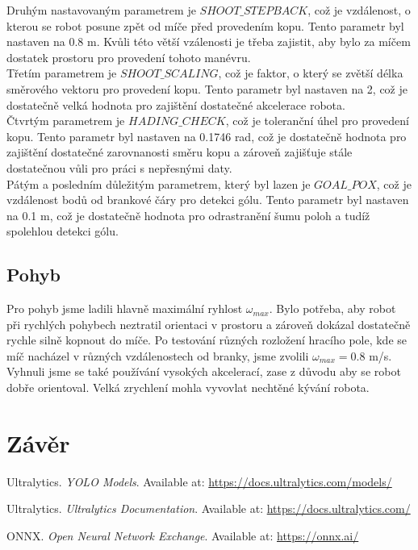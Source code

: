 \documentclass[a4paper,12pt]{article}
\begin{document}
Druhým nastavovaným parametrem je $SHOOT\_STEPBACK$, což je vzdálenost, o kterou se robot posune zpět od míče před provedením kopu. Tento parametr byl nastaven na 0.8 m. Kvůli této větší vzálenosti je třeba zajistit, aby bylo za míčem dostatek prostoru pro provedení tohoto manévru.\\
Třetím parametrem je $SHOOT\_SCALING$, což je faktor, o který se zvětší délka směrového vektoru pro provedení kopu. Tento parametr byl nastaven na 2, což je dostatečně velká hodnota pro zajištění dostatečné akcelerace robota.\\
Čtvrtým parametrem je $HADING\_CHECK$, což je toleranční úhel pro provedení kopu. Tento parametr byl nastaven na 0.1746 rad, což je dostatečně hodnota pro zajištění dostatečné zarovnanosti směru kopu a zároveň zajišťuje stále dostatečnou vůli pro práci s nepřesnými daty.\\
Pátým a posledním důležitým parametrem, který byl lazen je $GOAL\_POX$, což je vzdálenost bodů od brankové čáry pro detekci gólu. Tento parametr byl nastaven na 0.1 m, což je dostatečně hodnota pro odrastranění šumu poloh a tudíž spolehlou detekci gólu.\\

\subsection{Pohyb}
Pro pohyb jsme ladili hlavně maximální ryhlost $\omega_{max}$. Bylo potřeba, aby robot při rychlých pohybech neztratil orientaci v prostoru a zároveň dokázal dostatečně rychle silně kopnout do míče. Po testování různých rozložení hracího pole, kde se míč nacházel v různých vzdálenostech od branky, jsme zvolili $\omega_{max} = 0.8$ m/s.
Vyhnuli jsme se také používání vysokých akcelerací, zase z důvodu aby se robot dobře orientoval. Velká zrychlení mohla vyvovlat nechtěné kývání robota.
\section{Závěr}



\begin{thebibliography}{5}

    Ultralytics. \emph{YOLO Models}. Available at: \url{https://docs.ultralytics.com/models/}
    
    Ultralytics. \emph{Ultralytics Documentation}. Available at: \url{https://docs.ultralytics.com/}
    
    ONNX. \emph{Open Neural Network Exchange}. Available at: \url{https://onnx.ai/}
    
    \end{thebibliography}
\end{document}
